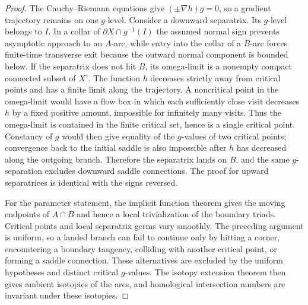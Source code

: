 \documentclass[reqno]{article}
\theoremstyle{definition}
\theoremstyle{remark}
\theoremstyle{plain}
\begin{document}
\begin{proof}
The Cauchy--Riemann equations give $(\pm\nabla h)g=0$, so a gradient trajectory remains on one $g$-level. Consider a downward separatrix. Its $g$-level belongs to $I$. In a collar of $\partial X\cap g^{-1}(I)$ the assumed normal sign prevents asymptotic approach to an $A$-arc, while entry into the collar of a $B$-arc forces finite-time transverse exit because the outward normal component is bounded below. If the separatrix does not hit $B$, its omega-limit is a nonempty compact connected subset of $X^\circ$. The function $h$ decreases strictly away from critical points and has a finite limit along the trajectory. A noncritical point in the omega-limit would have a flow box in which each sufficiently close visit decreases $h$ by a fixed positive amount, impossible for infinitely many visits. Thus the omega-limit is contained in the finite critical set, hence is a single critical point. Constancy of $g$ would then give equality of the $g$-values of two critical points; convergence back to the initial saddle is also impossible after $h$ has decreased along the outgoing branch. Therefore the separatrix lands on $B$, and the same $g$-separation excludes downward saddle connections. The proof for upward separatrices is identical with the signs reversed.

For the parameter statement, the implicit function theorem gives the moving endpoints of $A\cap B$ and hence a local trivialization of the boundary triads. Critical points and local separatrix germs vary smoothly. The preceding argument is uniform, so a landed branch can fail to continue only by hitting a corner, encountering a boundary tangency, colliding with another critical point, or forming a saddle connection. These alternatives are excluded by the uniform hypotheses and distinct critical $g$-values. The isotopy extension theorem then gives ambient isotopies of the arcs, and homological intersection numbers are invariant under these isotopies.
\end{proof}
\end{document}
